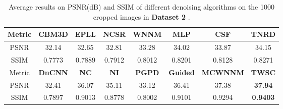 \begin{table}[t!]
\caption{Average results on PSNR(dB) and SSIM of different denoising algorithms on the 1000 cropped images in \textbf{Dataset 2} \cite{dnd2017}.}
\scriptsize
\label{tab6-7}
\begin{center}
\renewcommand\arraystretch{1.2}
\begin{tabular*}{1\textwidth}{@{\extracolsep{\fill}}cccccccc}
\hline
Metric
&
\textbf{CBM3D}
&
\textbf{EPLL}
&
\textbf{NCSR}
&
\textbf{WNNM}
&
\textbf{MLP}
&
\textbf{CSF}
&
\textbf{TNRD}
\\
\hline
PSNR & 32.14 &  32.65 & 32.81 & 33.28  & 34.02  & 33.87  & 34.15
\\
\hline
SSIM & 0.7773 & 0.7889  & 0.7912  & 0.8012  &  0.8201 & 0.8128  & 0.8271
\\
\hline
Metric

&
\textbf{DnCNN}
&
\textbf{NC}
&
\textbf{NI}
&
\textbf{PGPD}
&
\textbf{Guided}
&
\textbf{MCWNNM}
&
\textbf{TWSC}
\\
\hline
PSNR & 32.41 & 36.07 & 35.11 & 33.12 & 36.41 & 37.38 &  \textbf{37.94}
\\
\hline
SSIM & 0.7897 & 0.9013 & 0.8778 & 0.8002 & 0.9101 & 0.9294 &  \textbf{0.9403}
\\
\hline
\end{tabular*}
\end{center}
\end{table}

